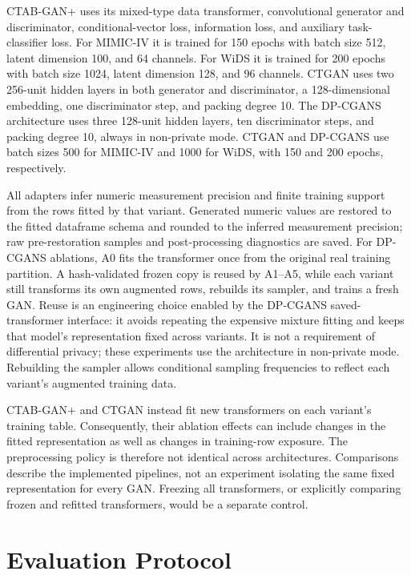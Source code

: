 CTAB-GAN+ uses its mixed-type data transformer, convolutional generator and
discriminator, conditional-vector loss, information loss, and auxiliary
task-classifier loss. For MIMIC-IV it is trained for 150 epochs with batch size
512, latent dimension 100, and 64 channels. For WiDS it is trained for 200
epochs with batch size 1024, latent dimension 128, and 96 channels. CTGAN uses
two 256-unit hidden layers in both generator and discriminator, a 128-dimensional
embedding, one discriminator step, and packing degree 10. The DP-CGANS
architecture uses three 128-unit hidden layers, ten discriminator steps, and
packing degree 10, always in non-private mode. CTGAN and DP-CGANS use batch
sizes 500 for MIMIC-IV and 1000 for WiDS, with 150 and 200 epochs,
respectively.

All adapters infer numeric measurement precision and finite training support
from the rows fitted by that variant. Generated numeric values are restored to
the fitted dataframe schema and rounded to the inferred measurement precision;
raw pre-restoration samples and post-processing diagnostics are saved. For
DP-CGANS ablations, A0 fits the transformer once from the original real
training partition. A hash-validated frozen copy is reused by A1--A5, while
each variant still transforms its own augmented rows, rebuilds its sampler,
and trains a fresh GAN. Reuse is an engineering choice enabled by the
DP-CGANS saved-transformer interface: it avoids repeating the expensive
mixture fitting and keeps that model's representation fixed across variants.
It is not a requirement of differential privacy; these experiments use the
architecture in non-private mode. Rebuilding the sampler allows conditional
sampling frequencies to reflect each variant's augmented training data.

CTAB-GAN+ and CTGAN instead fit new transformers on each variant's training
table. Consequently, their ablation effects can include changes in the fitted
representation as well as changes in training-row exposure. The preprocessing
policy is therefore not identical across architectures. Comparisons describe
the implemented pipelines, not an experiment isolating the same fixed
representation for every GAN. Freezing all transformers, or explicitly
comparing frozen and refitted transformers, would be a separate control.

\section{Evaluation Protocol}
\label{sec:evaluation_protocol}

